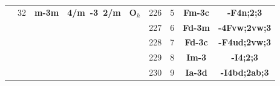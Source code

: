 \documentclass{article}      %
\begin{document}
\begin{small}
\begin{longtable}[c]{|c|c|c|c|c|c|c|c|c|}
 & \textrm{32} &\textbf{m-3m} &\textbf{4/m~-3~2/m} &$\mathbf{O}_{h}$ &\textrm{226} & 5&\textbf{Fm-3c}&\textbf{-F4n;2;3} \\\cline{6-9}
 & & & & &\textrm{227} & 6&\textbf{Fd-3m}&\textbf{-4Fvw;2vw;3} \\\cline{6-9}
 & & & & &\textrm{228} & 7&\textbf{Fd-3c}&\textbf{-F4ud;2vw;3} \\\cline{6-9}
 & & & & &\textrm{229} & 8&\textbf{Im-3}&\textbf{-I4;2;3} \\\cline{6-9}
 & & & & &\textrm{230} & 9&\textbf{Ia-3d}&\textbf{-I4bd;2ab;3} \\\hline
\end{longtable}
\end{small}

\clearpage     %
\end{document}
